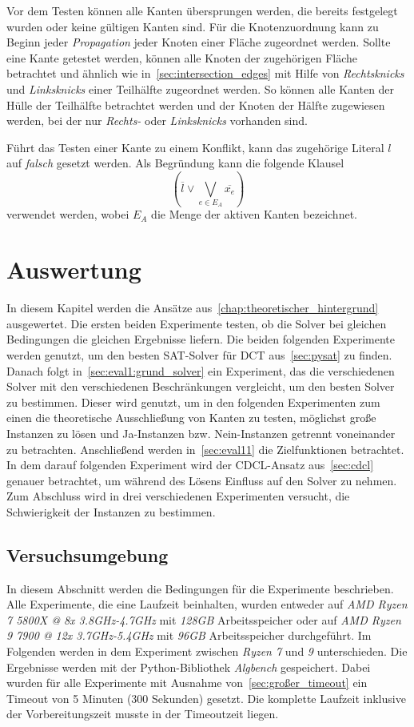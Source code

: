 Vor dem Testen können alle Kanten übersprungen werden, die bereits festgelegt wurden oder keine gültigen Kanten sind.
Für die Knotenzuordnung kann zu Beginn jeder \emph{Propagation} jeder Knoten einer Fläche zugeordnet werden.
Sollte eine Kante getestet werden, können alle Knoten der zugehörigen Fläche betrachtet und ähnlich wie in~\cref{sec:intersection_edges} mit Hilfe von \emph{Rechtsknicks} und \emph{Linksknicks} einer Teilhälfte zugeordnet werden.
So können alle Kanten der Hülle der Teilhälfte betrachtet werden und der Knoten der Hälfte zugewiesen werden, bei der nur \emph{Rechts-} oder \emph{Linksknicks} vorhanden sind.

Führt das Testen einer Kante zu einem Konflikt, kann das zugehörige Literal \(l\) auf \emph{falsch} gesetzt werden. Als Begründung kann die folgende Klausel
\[
(\overline{l} \lor \bigvee_{e \in E_A}\overline{x_e})
\]
verwendet werden, wobei \(E_A\) die Menge der aktiven Kanten bezeichnet.



\chapter{Auswertung}
In diesem Kapitel werden die Ansätze aus~\cref{chap:theoretischer_hintergrund} ausgewertet.
Die ersten beiden Experimente testen, ob die Solver bei gleichen Bedingungen die gleichen Ergebnisse liefern.
Die beiden folgenden Experimente werden genutzt, um den besten SAT-Solver für DCT aus~\cref{sec:pysat} zu finden.
Danach folgt in~\cref{sec:eval1:grund_solver} ein Experiment, das die verschiedenen Solver mit den verschiedenen Beschränkungen vergleicht, um den besten Solver zu bestimmen.
Dieser wird genutzt, um in den folgenden Experimenten zum einen die theoretische Ausschließung von Kanten zu testen, möglichst große Instanzen zu lösen und Ja-Instanzen bzw. Nein-Instanzen getrennt voneinander zu betrachten.
Anschließend werden in~\cref{sec:eval11} die Zielfunktionen betrachtet.
In dem darauf folgenden Experiment wird der CDCL-Ansatz aus~\cref{sec:cdcl} genauer betrachtet, um während des Lösens Einfluss auf den Solver zu nehmen.
Zum Abschluss wird in drei verschiedenen Experimenten versucht, die Schwierigkeit der Instanzen zu bestimmen.


\section{Versuchsumgebung}
In diesem Abschnitt werden die Bedingungen für die Experimente beschrieben.
Alle Experimente, die eine Laufzeit beinhalten, wurden entweder auf \emph{AMD Ryzen 7 5800X @ 8x 3.8GHz-4.7GHz} mit \emph{128GB} Arbeitsspeicher oder auf \emph{AMD Ryzen 9 7900 @ 12x 3.7GHz-5.4GHz} mit \emph{96GB} Arbeitsspeicher durchgeführt.
Im Folgenden werden in dem Experiment zwischen \emph{Ryzen 7} und \emph{9} unterschieden.
Die Ergebnisse werden mit der Python-Bibliothek \emph{Algbench} gespeichert.
Dabei wurden für alle Experimente mit Ausnahme von~\cref{sec:großer_timeout} ein Timeout von 5 Minuten (300 Sekunden) gesetzt.
Die komplette Laufzeit inklusive der Vorbereitungszeit musste in der Timeoutzeit liegen.

